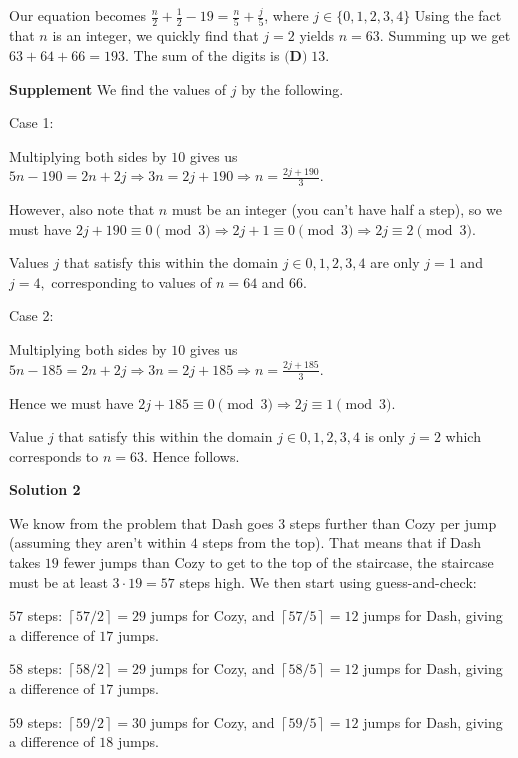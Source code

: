\begin{enumerate}
 Our equation becomes $\frac{n}{2} +\frac{1}{2} - 19 = \frac{n}{5} + \frac{j}{5}$, where $j \in \{0,1,2,3,4\}$ Using the fact that $n$ is an integer, we quickly find that $j=2$ yields $n=63$. Summing up we get $63+64+66=193$. The sum of the digits is $\boxed{\textbf{(D)}\; 13}$.

 \textbf{Supplement} We find the values of $j$ by the following.

 Case 1:

 Multiplying both sides by $10$ gives us $5n-190=2n+2j \Rightarrow 3n=2j+190 \Rightarrow n=\frac{2j+190}{3}.$

 However, also note that $n$ must be an integer (you can't have half a step), so we must have $2j+190\equiv 0 \pmod 3 \Rightarrow 2j+1 \equiv 0 \pmod 3 \Rightarrow 2j \equiv 2 \pmod 3.$

 Values $j$ that satisfy this within the domain $j\in {0,1,2,3,4}$ are only $j=1$ and $j=4,$ corresponding to values of $n=64$ and $66.$

 Case 2:

 Multiplying both sides by $10$ gives us $5n-185=2n+2j \Rightarrow 3n = 2j + 185 \Rightarrow n=\frac{2j+185}{3}.$

 Hence we must have $2j+185 \equiv 0 \pmod 3 \Rightarrow 2j \equiv 1 \pmod 3.$

 Value $j$ that satisfy this  within the domain $j\in {0,1,2,3,4}$ is only $j=2$ which corresponds to $n=63.$ Hence follows.

 



\textbf{Solution 2}

We know from the problem that Dash goes $3$ steps further than Cozy per jump (assuming they aren't within $4$ steps from the top). That means that if Dash takes $19$ fewer jumps than Cozy to get to the top of the staircase, the staircase must be at least $3 \cdot 19=57$ steps high. We then start using guess-and-check:

 $57$ steps: $\left \lceil {57/2} \right \rceil = 29$ jumps for Cozy, and $\left \lceil {57/5} \right \rceil = 12$ jumps for Dash, giving a difference of $17$ jumps.

 $58$ steps: $\left \lceil {58/2} \right \rceil = 29$ jumps for Cozy, and $\left \lceil {58/5} \right \rceil = 12$ jumps for Dash, giving a difference of $17$ jumps.

 $59$ steps: $\left \lceil {59/2} \right \rceil = 30$ jumps for Cozy, and $\left \lceil {59/5} \right \rceil = 12$ jumps for Dash, giving a difference of $18$ jumps.


\end{enumerate}
